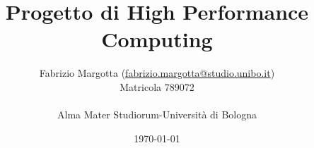 \documentclass[a4paper]{article}
\begin{document}
\title{Progetto di High Performance Computing}
\author{Fabrizio Margotta
(\href{mailto:fabrizio.margotta@studio.unibo.it}{fabrizio.margotta@studio.unibo.it})\\
    Matricola 789072\\
    \\
  Alma Mater Studiorum-Università di Bologna\\}
\date{\today}

\maketitle \thispagestyle{empty}

%
\pagestyle{headings}


%



%


%
\end{document}
